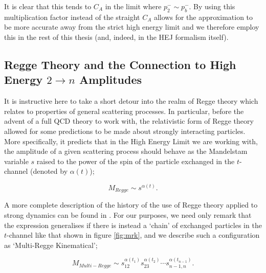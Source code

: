 It is clear that this tends to $C_A$ in the limit where $p_2^- \sim p_b^-$. By using this multiplication factor instead of the straight $C_A$ allows for the approximation to be more accurate away from the strict high energy limit and we therefore employ this in the rest of this thesis (and, indeed, in the HEJ formalism itself). 

\subsection{Regge Theory and the Connection to High Energy $2 \to n$ Amplitudes} 

It is instructive here to take a short detour into the realm of Regge theory which relates to properties of general scattering processes. In particular, before the advent of a full QCD theory to work with, the relativistic form of Regge theory allowed for some predictions to be made about strongly interacting particles. More specifically, it predicts that in the High Energy Limit we are working with, the amplitude of a given scattering process should behave as the Mandelstam variable $s$ raised to the power of the spin of the particle exchanged in the $t$-channel (denoted by $\alpha(t)$);

\begin{equation}
M_{Regge} \sim s^{\alpha(t)}.
\end{equation}

A more complete description of the history of the use of Regge theory applied to strong dynamics can be found in \cite{pomeronbook}. For our purposes, we need only remark that the expression generalises if there is instead a `chain' of exchanged particles in the $t$-channel like that shown in figure \ref{fig:mrk}, and we describe such a configuration as `Multi-Regge Kinematical'; 

\begin{equation}
M_{Multi-Regge} \sim s_{12}^{\alpha(t_1)} s_{23}^{\alpha(t_2)} \cdots s_{n-1,n}^{\alpha(t_{n-1})}.
\end{equation}

